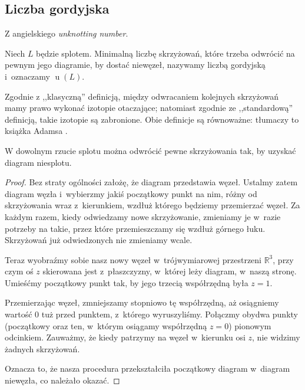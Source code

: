 \subsection{Liczba gordyjska} %

Z angielskiego \emph{unknotting number}.

\begin{definition}
    Niech $L$ będzie splotem.
    Minimalną liczbę skrzyżowań, które trzeba odwrócić na pewnym jego diagramie, by dostać niewęzeł, nazywamy liczbą gordyjską i~oznaczamy $\operatorname{u}(L)$.
\end{definition}

Zgodnie z ,,klasyczną'' definicją, między odwracaniem kolejnych skrzyżowań mamy prawo wykonać izotopie otaczające; natomiast zgodnie ze ,,standardową'' definicją, takie izotopie są zabronione.
Obie definicje są równoważne: tłumaczy to książka Adamsa \cite[s. 58]{adams94}.

\begin{lemma}
    \label{lem:unknotting_well_defined}
    W dowolnym rzucie splotu można odwrócić pewne skrzyżowania tak, by uzyskać diagram niesplotu.
\end{lemma}

\begin{proof}
    Bez straty ogólności założę, że diagram przedstawia węzeł.
    Ustalmy zatem diagram węzła i~wybierzmy jakiś początkowy punkt na nim, różny od skrzyżowania wraz z~kierunkiem, wzdłuż którego będziemy przemierzać węzeł.
    Za każdym razem, kiedy odwiedzamy nowe skrzyżowanie, zmieniamy je w~razie potrzeby na takie, przez które przemieszczamy się wzdłuż górnego łuku.
    Skrzyżowań już odwiedzonych nie zmieniamy wcale.

    Teraz wyobraźmy sobie nasz nowy węzeł w~trójwymiarowej przestrzeni $\mathbb R^3$, przy czym oś $z$ skierowana jest z~płaszczyzny, w~której leży diagram, w~naszą stronę.
    Umieśćmy początkowy punkt tak, by jego trzecią współrzędną była $z = 1$.

    Przemierzając węzeł, zmniejszamy stopniowo tę współrzędną, aż osiągniemy wartość $0$ tuż przed punktem, z~którego wyruszyliśmy.
    Połączmy obydwa punkty (początkowy oraz ten, w~którym osiągamy współrzędną $z = 0$) pionowym odcinkiem.
    Zauważmy, że kiedy patrzymy na węzeł w~kierunku osi $z$, nie widzimy żadnych skrzyżowań.

    Oznacza to, że nasza procedura przekształciła początkowy diagram w~diagram niewęzła, co należało okazać.
\end{proof}

